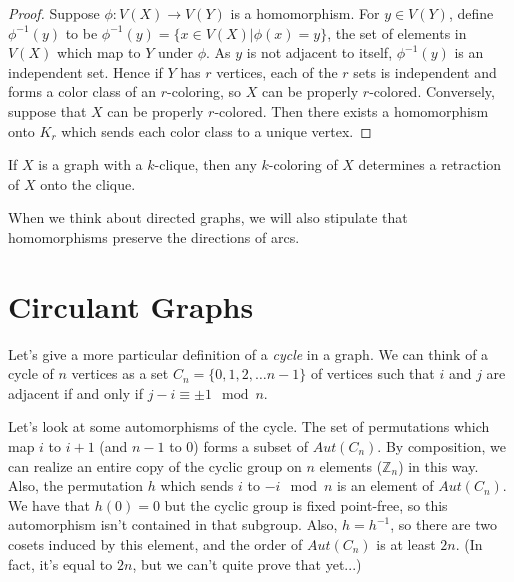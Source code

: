 

\begin{proof}
	Suppose $\phi:V(X)\rightarrow V(Y)$ is a homomorphism.  For $y\in V(Y)$, define $\phi^{-1}(y)$ to be $\phi^{-1}(y)=\{x\in V(X)|\phi(x)=y\}$, the set of elements in $V(X)$ which map to $Y$ under $\phi$.  As $y$ is not adjacent to itself, $\phi^{-1}(y)$ is an independent set.  Hence if $Y$ has $r$ vertices, each of the $r$ sets is independent and forms a color class of an $r$-coloring, so $X$ can be properly $r$-colored.  Conversely, suppose that $X$ can be properly $r$-colored.  Then there exists a homomorphism onto $K_r$ which sends each color class to a unique vertex.
\end{proof}


If $X$ is a graph with a $k$-clique, then any $k$-coloring of $X$ determines a retraction of $X$ onto the clique.

When we think about directed graphs, we will also stipulate that homomorphisms preserve the directions of arcs.



\section*{Circulant Graphs}

Let's give a more particular definition of a \textit{cycle} in a graph.  We can think of a cycle of $n$ vertices as a set $C_n=\{0,1,2,\dots n-1\}$ of vertices such that $i$ and $j$ are adjacent if and only if $j-i\equiv\pm 1\mod n$.

Let's look at some automorphisms of the cycle.  The set of permutations which map $i$ to $i+1$ (and $n-1$ to $0$) forms a subset of $Aut(C_n)$.  By composition, we can realize an entire copy of the cyclic group on $n$ elements ($\mathbb{Z}_n$) in this way.  Also, the permutation $h$ which sends $i$ to $-i\mod n$ is an element of $Aut(C_n)$.  We have that $h(0)=0$ but the cyclic group is fixed point-free, so this automorphism isn't contained in that subgroup.  Also, $h=h^{-1}$, so there are two cosets induced by this element, and the order of $Aut(C_n)$ is at least $2n$.  (In fact, it's equal to $2n$, but we can't quite prove that yet...)

